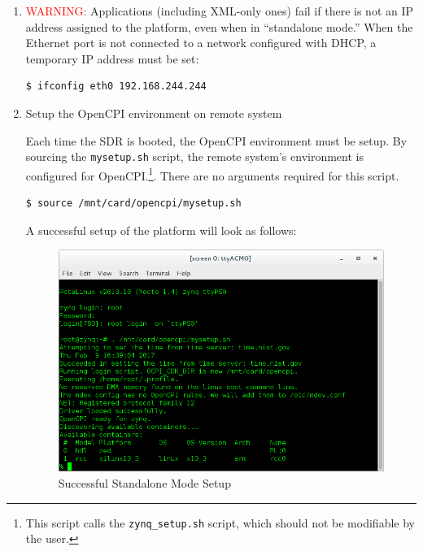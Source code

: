 \begin{enumerate}
\item \textcolor{red}{WARNING:}
Applications (including XML-only ones) fail if there is not an IP address assigned to the platform, even when in ``standalone mode.'' When the Ethernet port is not connected to a network configured with DHCP, a temporary IP address must be set:
\begin{verbatim}
$ ifconfig eth0 192.168.244.244
\end{verbatim} \medskip

\item Setup the OpenCPI environment on remote system

Each time the SDR is booted, the OpenCPI environment must be setup. By sourcing the \texttt{mysetup.sh} script, the remote system's environment is configured for OpenCPI.\footnote{This script calls the \texttt{zynq\_setup.sh} script, which should not be modifiable by the user.}. There are no arguments required for this script.
\begin{verbatim}
$ source /mnt/card/opencpi/mysetup.sh
\end{verbatim} \medskip

\noindent A successful setup of the platform will look as follows:
\begin{figure}[H]
	\centerline{\includegraphics[scale=0.5]{zed_setup}}
	\caption{Successful Standalone Mode Setup}
	\label{fig:standalonesetup}
\end{figure} \medskip



\end{enumerate}

\pagebreak
